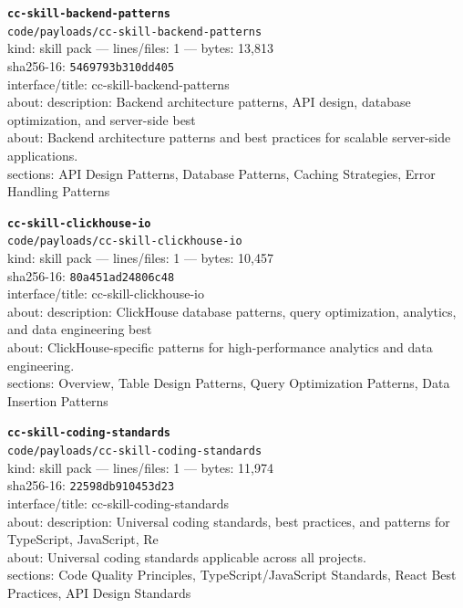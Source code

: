 \noindent\textbf{\texttt{cc-skill-backend-patterns}}\\
\texttt{code/payloads/cc-skill-backend-patterns}\\
kind: skill pack --- lines/files: 1 --- bytes: 13,813\\
sha256-16: \texttt{5469793b310dd405}\\
interface/title: cc-skill-backend-patterns\\
about: description: Backend architecture patterns, API design, database optimization, and server-side best \\
about: Backend architecture patterns and best practices for scalable server-side applications.\\
sections: API Design Patterns, Database Patterns, Caching Strategies, Error Handling Patterns\\
\vspace*{6.0pt}

\noindent\textbf{\texttt{cc-skill-clickhouse-io}}\\
\texttt{code/payloads/cc-skill-clickhouse-io}\\
kind: skill pack --- lines/files: 1 --- bytes: 10,457\\
sha256-16: \texttt{80a451ad24806c48}\\
interface/title: cc-skill-clickhouse-io\\
about: description: ClickHouse database patterns, query optimization, analytics, and data engineering best \\
about: ClickHouse-specific patterns for high-performance analytics and data engineering.\\
sections: Overview, Table Design Patterns, Query Optimization Patterns, Data Insertion Patterns\\
\vspace*{6.0pt}

\noindent\textbf{\texttt{cc-skill-coding-standards}}\\
\texttt{code/payloads/cc-skill-coding-standards}\\
kind: skill pack --- lines/files: 1 --- bytes: 11,974\\
sha256-16: \texttt{22598db910453d23}\\
interface/title: cc-skill-coding-standards\\
about: description: Universal coding standards, best practices, and patterns for TypeScript, JavaScript, Re\\
about: Universal coding standards applicable across all projects.\\
sections: Code Quality Principles, TypeScript/JavaScript Standards, React Best Practices, API Design Standards\\
\vspace*{6.0pt}

